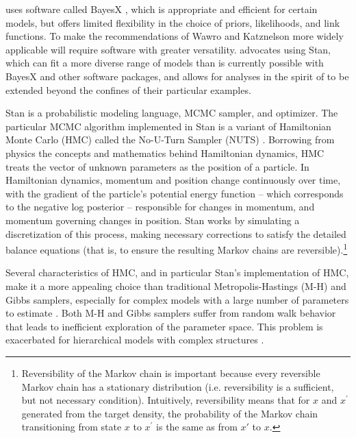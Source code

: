  uses software called BayesX , which 
is appropriate and  efficient for certain models, but offers limited flexibility in the choice of priors, 
likelihoods, and link functions. To make the recommendations of Wawro and Katznelson more widely 
applicable will require software with greater versatility.  advocates 
using Stan, which can fit a more diverse range of models than is currently possible with BayesX 
and other software packages, and allows for analyses in the spirit of  
to be extended beyond the confines of their particular examples.  

Stan is a probabilistic modeling language, MCMC sampler, and optimizer. The particular MCMC 
algorithm implemented in Stan is a variant of Hamiltonian Monte Carlo (HMC) called the No-U-Turn 
Sampler (NUTS) . Borrowing from physics the concepts and mathematics 
behind Hamiltonian dynamics, HMC treats the vector of unknown parameters as the position of a 
particle. In Hamiltonian dynamics, momentum and position change continuously over time, with the 
gradient of the particle's potential energy function --  which corresponds to the negative log posterior 
-- responsible for changes in momentum, and momentum governing changes in position. Stan works 
by simulating a discretization of this process, making necessary corrections to satisfy the detailed 
balance equations (that is, to ensure the resulting Markov chains are reversible).\footnote{Reversibility 
of the Markov chain is important because every reversible Markov chain has a stationary distribution 
(i.e. reversibility is a sufficient, but not necessary condition). Intuitively, reversibility means that for 
$x$ and $x^\prime$ generated from the target density, the probability of the Markov chain 
transitioning from state $x$ to $x^\prime$ is the same as from $x'$ to $x$.}  

Several characteristics of HMC, and in particular Stan's implementation of HMC, make it a more 
appealing choice than traditional Metropolis-Hastings (M-H) and Gibbs samplers, especially for 
complex models with a large number of parameters to estimate . Both M-H and Gibbs samplers suffer from random walk 
behavior that leads to inefficient exploration of the parameter space. This problem is exacerbated 
for hierarchical models with complex structures .

